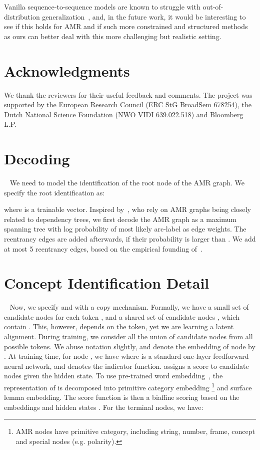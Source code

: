 \documentclass[11pt]{article}
\begin{document}
Vanilla sequence-to-sequence models are known to struggle with out-of-distribution generalization~\cite{lake18a,bahdanau2018systematic}, and, in the future work, it would be interesting to see if this   holds for AMR and if such more constrained and structured methods as ours can better deal with this more challenging but realistic setting.

\section*{Acknowledgments}
We thank the reviewers for their useful feedback and comments.
The project was supported by the European Research Council (ERC StG BroadSem 678254), the Dutch National Science Foundation (NWO VIDI 639.022.518) and Bloomberg L.P.




\newpage



\newpage

\appendix
\newpage\section{Decoding}~\label{append:seg_decode}
We need to model the identification of the root node of the AMR graph. We specify the root identification as:

where  is a trainable vector. Inspired by~, who rely on AMR graphs being closely related to dependency trees, we first decode the AMR graph as a maximum spanning tree with log probability of most likely arc-label as edge weights. The reentrancy edges are added afterwards, if their probability is larger than . We add at most 5 reentrancy edges, based on the empirical founding of~. 


\section{Concept Identification Detail}~\label{append:concept}
Now, we specify  and  with a copy mechanism. Formally, we have a small set of candidate nodes   for each token , and a shared set of candidate nodes , which contain . This, however, depends on the token, yet we are learning a latent alignment. During training, we consider all the union of candidate nodes from all possible tokens. We abuse notation slightly, and denote the embedding of node  by . At training time, for node , we have 
where  is a standard one-layer feedforward neural network, and  denotes the indicator function.  assigns a score to candidate nodes given the hidden state. To use pre-trained word embedding~\cite{pennington2014glove}, the representation of  is decomposed into primitive category embedding \footnote{AMR nodes have primitive category, including string, number, frame, concept and special nodes (e.g. polarity).} and surface lemma embedding. The score function is then a biaffine scoring based on the embeddings and hidden states . For the terminal nodes, we have:
\end{document}
